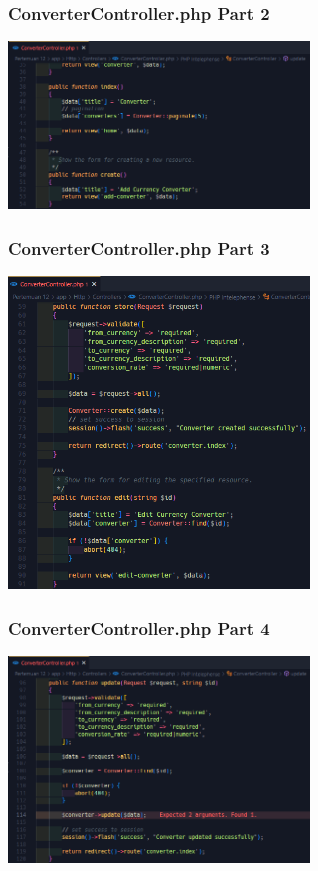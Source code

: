 \documentclass[aspectratio=169, table]{beamer}
\begin{document}
\begin{frame}[fragile]
 \frametitle{ConverterController.php Part 2}
 \vskip1cm
 \begin{center}
  \includegraphics[width=0.6\textwidth]{classFiles/pertemuan-12-controller-part-2.png}
 \end{center}
\end{frame}

\begin{frame}[fragile]
 \frametitle{ConverterController.php Part 3}
 \vskip1cm
 \begin{center}
  \includegraphics[width=0.6\textwidth]{classFiles/pertemuan-12-controller-part-3.png}
 \end{center}
\end{frame}

\begin{frame}[fragile]
 \frametitle{ConverterController.php Part 4}
 \vskip1cm
 \begin{center}
  \includegraphics[width=0.6\textwidth]{classFiles/pertemuan-12-controller-part-4.png}
 \end{center}
\end{frame}
\end{document}
